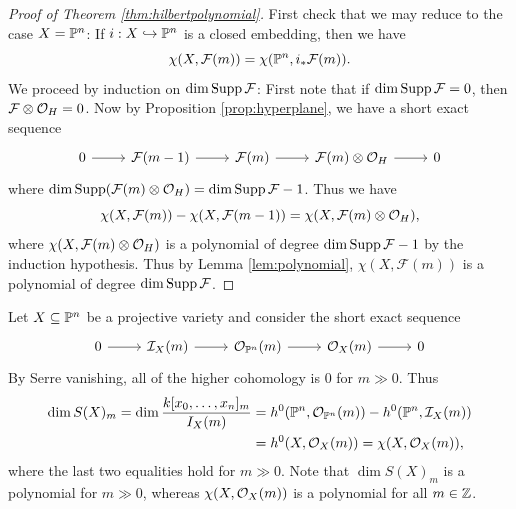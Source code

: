 \begin{proof}[Proof of Theorem \ref{thm:hilbertpolynomial}]
  First check that
  we may reduce to the case $X = \mathbb{P}^n$:
  If $i : X \hookrightarrow \mathbb{P}^n$
  is a closed embedding, then we have
  \[
    \chi(X, \mathcal{F}(m))
    = \chi(\mathbb{P}^n, i_* \mathcal{F}(m)).
  \]
  We proceed by induction on
  $\dim \operatorname{Supp} \mathcal{F}$:
  First note that if
  $\dim \operatorname{Supp} \mathcal{F} = 0$, then
  $\mathcal{F} \otimes \mathcal{O}_H = 0$.
  Now by Proposition \ref{prop:hyperplane}, we have a short exact sequence
  \[
    \begin{tikzcd}
      0 \ar[r] & \mathcal{F}(m - 1)
      \ar[r] & \mathcal{F}(m) \ar[r] & \mathcal{F}(m) \otimes \OO_H \ar[r] & 0
    \end{tikzcd}
  \]
  where
  $\dim \operatorname{Supp}(\mathcal{F}(m) \otimes \mathcal{O}_H) = \dim \operatorname{Supp} \mathcal{F} - 1$.
  Thus we have
  \[
    \chi(X, \mathcal{F}(m))
    - \chi(X, \mathcal{F}(m - 1))
    = \chi(X, \mathcal{F}(m) \otimes \mathcal{O}_H),
  \]
  where $\chi(X, \mathcal{F}(m) \otimes \mathcal{O}_H)$ is a polynomial of degree
  $\dim \operatorname{Supp} \mathcal{F} - 1$ by the induction
  hypothesis. Thus
  by Lemma \ref{lem:polynomial}, $\chi(X, \mathcal{F}(m))$ is a polynomial of degree $\dim \operatorname{Supp} \mathcal{F}$.
\end{proof}

\begin{remark}
  Let $X \subseteq \mathbb{P}^n$ be a projective
  variety and consider the short exact sequence
  \[
    \begin{tikzcd}
      0 \ar[r] & \mathcal{I}_X(m)
      \ar[r] & \OO_{\PP^n}(m) \ar[r] & \OO_X(m) \ar[r] & 0
    \end{tikzcd}
  \]
  By Serre vanishing, all of the
  higher cohomology is $0$ for $m \gg 0$. Thus
  \begin{align*}
    \dim S(X)_m
    = \dim \frac{k[x_0, \dots, x_n]_m}{I_X(m)}
    &= h^0(\mathbb{P}^n, \mathcal{O}_{\mathbb{P}^n}(m)) - h^0(\mathbb{P}^n, \mathcal{I}_X(m)) \\
    &= h^0(X, \mathcal{O}_X(m))
    = \chi(X, \mathcal{O}_X(m)),
  \end{align*}
  where the last two equalities hold for
  $m \gg 0$. Note that
  $\dim S(X)_m$ is a polynomial for $m \gg 0$,
  whereas $\chi(X, \mathcal{O}_X(m))$ is a polynomial for all $m \in \mathbb{Z}$.
\end{remark}
